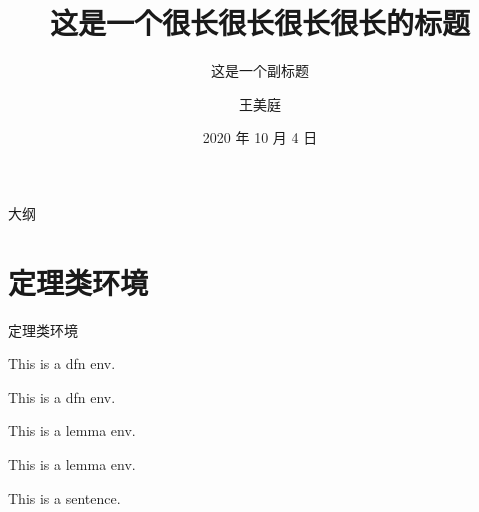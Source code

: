\documentclass[compress,10pt,dvipsnames,notheorems]{beamer} %
\title[正短标题]{这是一个很长很长很长很长的标题}
\subtitle[副短标题]{这是一个副标题}
\author[王美庭]{王美庭}
\institute[IESR-JNU]{
	\textcolor[rgb]{0.0,0.0,0.1}{\small\ttfamily 经济与社会研究院，暨南大学}
}
\date[2020/10/4]{\small 2020 年 10 月 4 日}
\begin{document}
	
\begin{frame} %
	\titlepage
\end{frame}

{
\begin{frame}[noframenumbering]{大纲} %
	\tableofcontents[hideallsubsections]
\end{frame}
}


\section{定理类环境}%

\begin{frame}{定理类环境}
	\begin{dfn}
		This is a dfn env.
	\end{dfn}\vspace{\baselineskip}

	\begin{dfn}\label{dfn:xxx}
		This is a dfn env.
	\end{dfn}\vspace{\baselineskip}
	
	\begin{lemma}
		This is a lemma env.
	\end{lemma}\vspace{\baselineskip}

	\begin{lemma}
		This is a lemma env.
	\end{lemma}\vspace{\baselineskip}

	\begin{thm}
		This is a sentence.
	\end{thm}
\end{frame}
\end{document}
